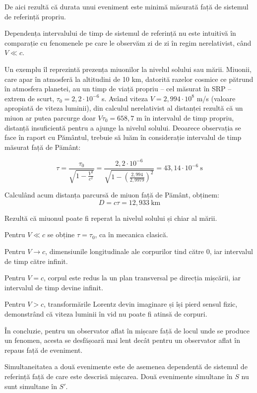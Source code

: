 \documentclass[a4paper, 12pt]{article}
\newcommand{\parbreak}{\vspace{1cm}}
\newcommand{\lorentzradical}{\sqrt{1 - \frac{V^2}{c^2}}}
\begin{document}
De aici rezultă că durata unui eveniment este minimă măsurată față de sistemul
de referință propriu.

\parbreak

Dependența intervalului de timp de sistemul de referință nu este intuitivă în
comparație cu fenomenele pe care le observăm zi de zi în regim nerelativist,
când \( V \ll c \).

Un exemplu îl reprezintă prezența miuonilor la nivelul solului sau mării.
Miuonii, care apar în atmosferă la altitudini de 10 km, datorită razelor
cosmice ce pătrund în atmosfera planetei, au un timp de viață propriu -- cel
măsurat în SRP -- extrem de scurt, \( \tau_0 = 2,2 \cdot 10^{-6} \) s. Având
viteza \( V = 2,994 \cdot 10^8 \) m/s (valoare apropiată de viteza luminii),
din calculul nerelativist al distanței rezultă că un miuon ar putea parcurge
doar \( V\tau_0 = 658,7 \) m în intervalul de timp propriu, distanță
insuficientă pentru a ajunge la nivelul solului.  Deoarece observația se face
în raport cu Pământul, trebuie să luăm în considerație intervalul de timp
măsurat față de Pământ:

\[
    \tau = \frac{\tau_0}{\lorentzradical}
    = \frac{2,2 \cdot 10^{-6}}{\sqrt{1 - \left( \frac{2,994}{2,9979} \right)^2}}
    = 43,14 \cdot 10^{-6} ~ \mathrm{s}
\]

Calculând acum distanța parcursă de miuon față de Pământ, obținem:
\[ D = c\tau = 12,933 ~ \mathrm{km} \]

Rezultă că miuonul poate fi reperat la nivelul solului și chiar al mării.

\pagebreak

Pentru \( V \ll c \) se obține \( \tau = \tau_0 \), ca în mecanica clasică.

Pentru \( V \rightarrow c \), dimensiunile longitudinale ale corpurilor tind
către 0, iar intervalul de timp către infinit.

Pentru \( V = c \), corpul este redus la un plan transversal pe direcția
mișcării, iar intervalul de timp devine infinit.

Pentru \( V > c \), transformările Lorentz devin imaginare și își pierd
sensul fizic, demonstrând că viteza luminii în vid nu poate fi atinsă de
corpuri.

În concluzie, pentru un observator aflat în mișcare față de locul unde se
produce un fenomen, acesta se desfășoară mai lent decât pentru un observator
aflat în repaus față de eveniment.

Simultaneitatea a două evenimente este de asemenea dependentă de sistemul de
referință față de care este descrisă mișcarea. Două evenimente simultane în
$S$ nu sunt simultane în $S'$.
\end{document}
